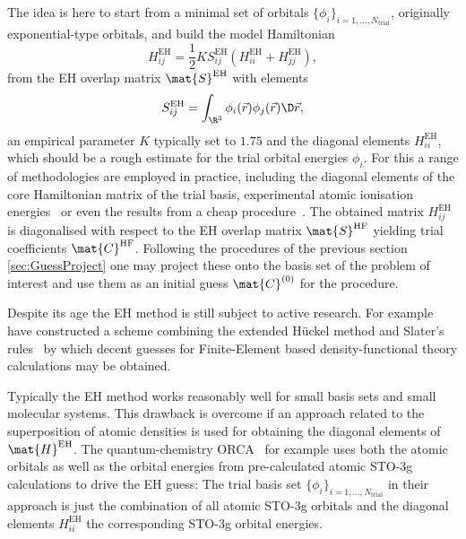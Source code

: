 The idea is here to start from a minimal set of orbitals
$\{\phi_i\}_{i=1,\ldots,N_\text{trial}}$,
originally exponential-type orbitals,
and build the model Hamiltonian
\[
	H_{ij}^\text{EH}
		= \frac12 K S^\text{EH}_{ij} \left( H_{ii}^\text{EH} + H_{jj}^\text{EH} \right),
\]
from the EH overlap matrix $\mat{S}^\text{EH}$ with elements
\[ S^\text{EH}_{ij} = \int_{\R^3} \phi_i(\vec{r}) \phi_j(\vec{r}) \D\vec{r}, \]
an empirical parameter $K$ typically set to $1.75$
and the diagonal elements $H_{ii}^\text{EH}$,
which should be a rough estimate for the trial orbital energies $\phi_i$.
For this a range of methodologies are employed in practice,
including the diagonal elements of the core Hamiltonian matrix
of the trial basis,
experimental atomic ionisation energies~\cite{Yamehmop}
or even the results from a cheap \SCF procedure~\cite{ORCA}.
The obtained matrix $H_{ij}^\text{EH}$ is diagonalised with respect
to the EH overlap matrix $\mat{S}^\text{HF}$
yielding trial coefficients $\mat{C}^\text{HF}$.
Following the procedures of the previous section \ref{sec:GuessProject}
one may project these onto the basis set of the problem of interest
and use them as an initial guess $\mat{C}^{(0)}$ for the \SCF procedure.

Despite its age the EH method is still subject to active research.
For example \citet{Lee2015} have constructed a scheme combining
the extended Hückel method and Slater's rules~\cite{Slater1930}
by which decent guesses for Finite-Element based density-functional theory
calculations may be obtained.

Typically the EH method works reasonably well
for small basis sets and small molecular systems.
This drawback is overcome if an approach related to the
superposition of atomic densities is used for obtaining the diagonal
elements of $\mat{H}^\text{EH}$.
The quantum-chemistry ORCA~\cite{ORCA} for example
uses both the atomic orbitals as well as the orbital energies
from pre-calculated atomic STO-3g~\cite{Hehre1969} calculations
to drive the EH guess:
The trial basis set $\{\phi_i\}_{i=1,\ldots,N_\text{trial}}$
in their approach is just the combination of all atomic STO-3g orbitals
and the diagonal elements $H_{ii}^\text{EH}$ the corresponding STO-3g orbital energies.
